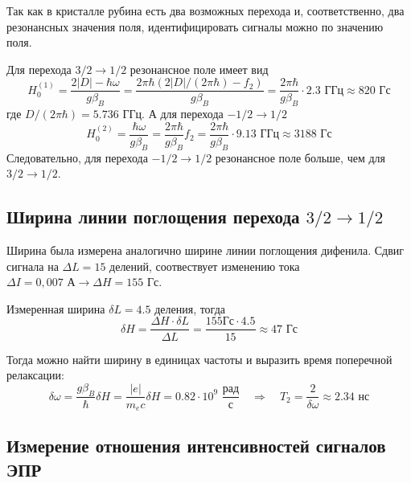 \documentclass[a4paper,14pt]{extarticle}
\begin{document}

Так как в кристалле рубина есть два возможных перехода и, соответственно, два резонансных значения поля, идентифицировать сигналы можно по значению поля. 

Для перехода $3/2 \rightarrow 1/2$ резонансное поле имеет вид \cite[стр. 24]{mar}
\begin{equation}
  H_0^{(1)} = \frac{2|D| - \hbar\omega}{g\beta_B} = 
              \frac{2\pi\hbar(2|D|/(2\pi\hbar) - f_2)}{g\beta_B}=
              \frac{2\pi\hbar}{g\beta_B}\cdot 2.3 \text{ ГГц}\approx 820 \text{ Гс}
\end{equation}
где $D/(2\pi \hbar)=5.736\text{ ГГц}$.
А для перехода $-1/2 \rightarrow 1/2$ \cite[стр. 24]{mar}
\begin{equation}
  H_0^{(2)} = \frac{\hbar\omega}{g\beta_B} = \frac{2\pi\hbar}{g\beta_B}f_2 =
  \frac{2\pi\hbar}{g\beta_B}\cdot 9.13 \text{ ГГц}\approx 3188 \text{ Гс}
\end{equation}
Следовательно, для перехода $-1/2 \rightarrow 1/2$ резонансное поле больше, чем для $3/2 \rightarrow 1/2$.


\subsection{Ширина линии поглощения перехода $3/2 \rightarrow 1/2$}
Ширина была измерена аналогично ширине линии поглощения дифенила. Сдвиг сигнала на $\Delta L=15 \text{ делений}$, соотвествует изменению тока $\Delta I=0,007 \text{ А}\to  \Delta H=155 \text{ Гс}$.

Измеренная ширина $\delta L=4.5 \text{ деления}$, тогда
\begin{equation}
\delta H = \frac{\Delta H\cdot \delta L}{\Delta L}=\frac{155 Гс\cdot 4.5}{15}\approx 47 \text{ Гс}
\end{equation}

Тогда можно найти ширину в единицах частоты и выразить время поперечной релаксации:
 \begin{equation}
  \delta \omega = \frac{g\beta_B}{\hbar} \delta H = \frac{|e|}{m_e c} \delta H = 0.82 \cdot 10^9 \,\,\frac{\text{рад}}{\text{с}}
  \quad \Rightarrow \quad
  T_2 = \frac{2}{\delta \omega} \approx 2.34 \text{ нс}
\end{equation}

\subsection{Измерение отношения интенсивностей сигналов ЭПР}
\end{document}
